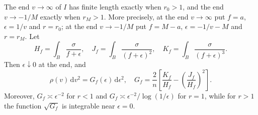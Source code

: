 \begin{lemma}\label{lem:warped-endpoint-length}
The end $v\to\infty$ of $I$ has finite length exactly when $r_0>1$, and the end $v\to-1/M$ exactly when $r_M>1$. More precisely, at the end $v\to\infty$ put $f=a$, $\epsilon=1/v$ and $r=r_0$; at the end $v\to-1/M$ put $f=M-a$, $\epsilon=-1/v-M$ and $r=r_M$. Let
\[
 H_f=\int_B\frac{\sigma}{f+\epsilon},\quad
 J_f=\int_B\frac{\sigma}{(f+\epsilon)^2},\quad
 K_f=\int_B\frac{\sigma}{(f+\epsilon)^3}.
\]
Then $\epsilon\downarrow0$ at the end, and
\begin{equation}\label{eq:warped-endpoint-variance}
 \rho(v)\,\mathrm{d}v^2=G_f(\epsilon)\,\mathrm{d}\epsilon^2,
 \quad
 G_f=\frac2n\left[\frac{K_f}{H_f}
                    -\left(\frac{J_f}{H_f}\right)^2\right].
\end{equation}
Moreover, $G_f\asymp\epsilon^{-2}$ for $r<1$ and $G_f\asymp\epsilon^{-2}/\log(1/\epsilon)$ for $r=1$, while for $r>1$ the function $\sqrt{G_f}$ is integrable near $\epsilon=0$.
\end{lemma}
